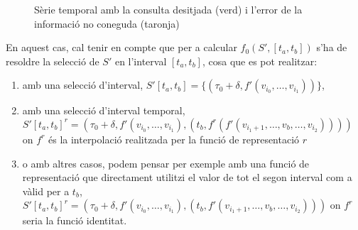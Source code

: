 \begin{figure}[tp]
  \centering

      \caption{Sèrie temporal amb la consulta desitjada (verd) i l'error de la
        informació no coneguda (taronja)}
  \label{fig:multiresolucio:informacio-subresolucions}
\end{figure}



En aquest cas, cal tenir en compte que per a calcular
$f_0(S',[t_a,t_b])$ s'ha de resoldre la selecció de $S'$ en l'interval $[t_a,t_b]$, cosa que es pot realitzar:

  \begin{enumerate}
  \item amb una selecció d'interval,  $S'[t_a,t_b]=\{ (\tau_0+\delta,
    f'(v_{i_0},\dotsc,v_{i_1}) ) \}$,

  \item amb una selecció d'interval temporal,
    $S'[t_a,t_b]^r=(\tau_0+\delta, f'(v_{i_0},\dotsc,v_{i_1}), (t_b,
    f^r(f'(v_{i_1+1},\dotsc,v_{b} ,\dotsc,v_{i_2}))) ) $ on $f^r$ és
    la interpolació realitzada per la funció de representació $r$

  \item o amb altres casos, podem pensar per exemple amb una funció de
    representació que directament utilitzi el valor de tot el segon
    interval com a vàlid per a $t_b$, $S'[t_a,t_b]^r=(\tau_0+\delta,
    f'(v_{i_0},\dotsc,v_{i_1}), (t_b, f'(v_{i_1+1},\dotsc,v_{b}
    ,\dotsc,v_{i_2})) )$ on $f^r$ seria la funció identitat.
   \end{enumerate}



